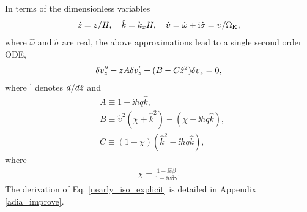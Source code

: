  In terms of the dimensionless variables
\begin{align}\label{nondim}
  \hat{z} = z/H,\quad \hat{k}=k_xH, \quad \hat{\upsilon} =\hat{\omega} +
  \mathrm{i}\hat{\sigma}= \upsilon/\Omega_{\rm K},
\end{align}
where $\hat{\omega}$ and $\hat{\sigma}$ are real, the above
approximations lead to a single second order ODE, 
\begin{align}
  \delta v_z^{\prime\prime} - z A\delta v_z^\prime +
  (B - C\hat{z}^2)\delta v_z = 0,\label{nearly_iso_explicit}
\end{align}
where $^\prime$ denotes $d/d\hat{z}$ and 
\begin{subequations}\begin{align}
  &A \equiv 1 + \ii h q \hat{k},\\
  &B \equiv \hat{\upsilon}^2\left(\chi + \hat{k}^2\right) -
  \left(\chi + \ii h q \hat{k}\right),\\
  &C \equiv \left(1-\chi\right)\left(\hat{k}^2 - \ii
    h q\hat{k}\right), 
\end{align}\end{subequations}
where
\begin{align}\label{chi}
\chi = \frac{1-\ii\hat{\upsilon}\beta}{1-\ii\hat{\upsilon}\beta\gamma}.
\end{align}
The derivation of Eq. \ref{nearly_iso_explicit}  is detailed in
Appendix \ref{adia_improve}. 
 

